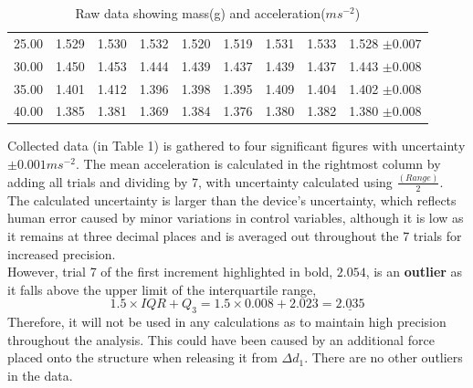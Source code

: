 \documentclass[11pt]{article}
\begin{document}
\begin{table}[H]
\begin{tabular}{ccccccccc}
25.00                                                    & 1.529                & 1.530                 & 1.532                & 1.520                 & 1.519               & 1.531               & 1.533               & 1.528 $\pm0.007$                                                                \\
\rowcolor[HTML]{EFEFEF} 
30.00                                                    & 1.450                & 1.453                 & 1.444                & 1.439                & 1.437               & 1.439               & 1.437               & 1.443 $\pm0.008$                                                                \\
35.00                                                    & 1.401                & 1.412                & 1.396                & 1.398                & 1.395               & 1.409               & 1.404               & 1.402 $\pm0.008$                                                                \\
\rowcolor[HTML]{EFEFEF} 
40.00                                                    & 1.385                & 1.381                & 1.369                & 1.384                & 1.376               & 1.380                & 1.382               & 1.380 $\pm0.008$                                                               
\end{tabular}
\caption{\label{tbl:1}Raw data showing mass(g) and acceleration($ms^{-2}$)}
\end{table}



Collected data (in Table 1) is gathered to four significant figures with uncertainty $\pm0.001ms^{-2}$. The mean acceleration is calculated in the rightmost column by adding all trials and dividing by 7, with uncertainty calculated using $\frac{(Range)}{2}$. The calculated uncertainty is larger than the device's uncertainty, which reflects human error caused by minor variations in control variables, although it is low as it remains at three decimal places and is averaged out throughout the 7 trials for increased precision. 
\\


However, trial 7 of the first increment highlighted in bold, $2.054$, is an \textbf{outlier} as it falls above the upper limit of the interquartile range, $$1.5\times IQR+Q_3=1.5\times0.008+2.023=\underline{2.035}$$ Therefore, it will not be used in any calculations as to maintain high precision throughout the analysis. This could have been caused by an additional force placed onto the structure when releasing it from $\Delta d_1$. There are no other outliers in the data. 
\\
\end{document}
